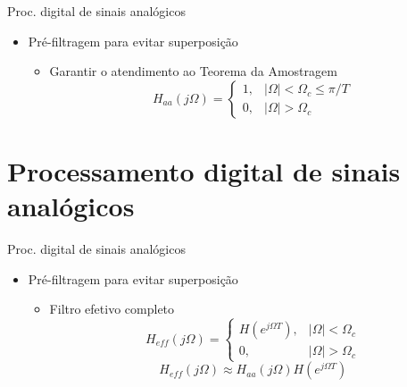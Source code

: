 \begin{slide}{Proc. digital de sinais anal\'ogicos}
 \begin{figure}
      \centering
   \end{figure}
\begin{itemize}
   \item Pré-filtragem para evitar superposição
   \begin{itemize}
      \item Garantir o atendimento ao Teorema da Amostragem
      \begin{equation}
         H_{aa}(j\Omega) = \begin{cases}1, & |\Omega|<\Omega_c\leq \pi/T \\ 0, & |\Omega|>\Omega_c                          \end{cases}
      \end{equation}
   \end{itemize}
\end{itemize}
\end{slide}

\section{Processamento digital de sinais analógicos}
\begin{slide}{Proc. digital de sinais anal\'ogicos}
\begin{itemize}
 \item Pré-filtragem para evitar superposição
   \begin{itemize}
      \item Filtro efetivo completo
      \begin{equation}
         H_{eff}(j\Omega) = \begin{cases}H(e^{j\Omega T}), & |\Omega|<\Omega_c\\ 0, & |\Omega|>\Omega_c                          \end{cases}
      \end{equation}
      \begin{equation}
         H_{eff}(j\Omega) \approx H_{aa}(j\Omega) H(e^{j\Omega T})
      \end{equation}
   \end{itemize}
\end{itemize}
\end{slide}

